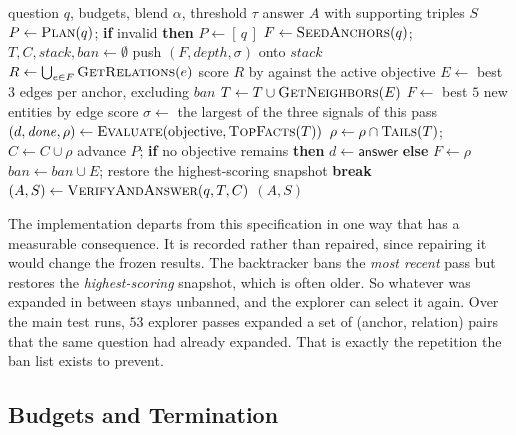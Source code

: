 \begin{algorithm}[!t]
\caption{AGR navigation, with the verification layer abstracted}
\label{alg:nav}
\small
\begin{algorithmic}[1]
\REQUIRE question $q$, budgets, blend $\alpha$, threshold $\tau$
\ENSURE answer $A$ with supporting triples $S$
\STATE $P \gets \textsc{Plan}(q)$; \textbf{if} invalid \textbf{then}
  $P \gets [\,q\,]$
\STATE $F \gets \textsc{SeedAnchors}(q)$; $T, C, \mathit{stack},
  \mathit{ban} \gets \emptyset$
  \STATE push $(F, \mathit{depth}, \sigma)$ onto $\mathit{stack}$
  \STATE $R \gets \bigcup_{e \in F} \textsc{GetRelations}(e)$
  \STATE score $R$ by  against the active objective
  \STATE $E \gets$ best $3$ edges per anchor, excluding $\mathit{ban}$
  \STATE $T \gets T \cup \textsc{GetNeighbors}(E)$
  \STATE $F \gets$ best $5$ new entities by edge score
  \STATE $\sigma \gets$ the largest of the three signals of this pass
  \STATE $(d, \mathit{done}, \rho) \gets \textsc{Evaluate}(\text{objective},
    \textsc{TopFacts}(T))$
  \STATE $\rho \gets \rho \cap \textsc{Tails}(T)$; $C \gets C \cup \rho$
    \STATE advance $P$; \textbf{if} no objective remains \textbf{then}
      $d \gets \textsf{answer}$ \textbf{else} $F \gets \rho$
  \ENDIF
    \STATE $\mathit{ban} \gets \mathit{ban} \cup E$; restore the
      highest-scoring snapshot
    \STATE \textbf{break}
  \ENDIF
\ENDWHILE
\STATE $(A, S) \gets \textsc{VerifyAndAnswer}(q, T, C)$
\RETURN $(A, S)$
\end{algorithmic}
\end{algorithm}

The implementation departs from this specification in one way that has a
measurable consequence. It is recorded rather than repaired, since repairing it
would change the frozen results. The backtracker bans the \emph{most recent}
pass but restores the \emph{highest-scoring} snapshot, which is often older. So
whatever was expanded in between stays unbanned, and the explorer can select it
again. Over the main test runs, $53$ explorer passes expanded a set of (anchor,
relation) pairs that the same question had already expanded. That is exactly the
repetition the ban list exists to prevent.

\subsection{Budgets and Termination}

